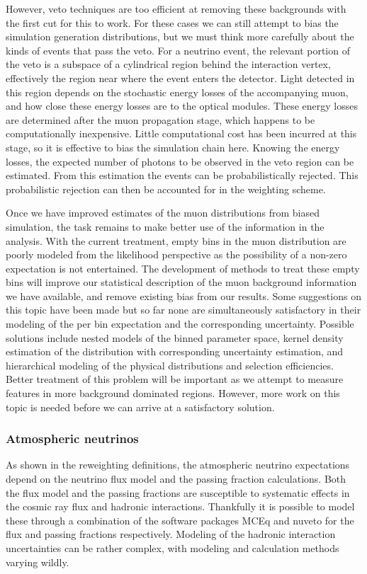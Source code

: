 However, veto techniques are too efficient at removing these backgrounds with the first cut for this to work.
For these cases we can still attempt to bias the simulation generation distributions, but we must think more carefully about the kinds of events that pass the veto.
For a neutrino event, the relevant portion of the veto is a subspace of a cylindrical region behind the interaction vertex, effectively the region near where the event enters the detector.
Light detected in this region depends on the stochastic energy losses of the accompanying muon, and how close these energy losses are to the optical modules.
These energy losses are determined after the muon propagation stage, which happens to be computationally inexpensive.
Little computational cost has been incurred at this stage, so it is effective to bias the simulation chain here.
Knowing the energy losses, the expected number of photons to be observed in the veto region can be estimated.
From this estimation the events can be probabilistically rejected.
This probabilistic rejection can then be accounted for in the weighting scheme.

Once we have improved estimates of the muon distributions from biased simulation, the task remains to make better use of the information in the analysis.
With the current treatment, empty bins in the muon distribution are poorly modeled from the likelihood perspective as the possibility of a non-zero expectation is not entertained.
The development of methods to treat these empty bins will improve our statistical description of the muon background information we have available, and remove existing bias from our results.
Some suggestions on this topic have been made but so far none are simultaneously satisfactory in their modeling of the per bin expectation and the corresponding uncertainty.
Possible solutions include nested models of the binned parameter space, kernel density estimation of the distribution with corresponding uncertainty estimation, and hierarchical modeling of the physical distributions and selection efficiencies.
Better treatment of this problem will be important as we attempt to measure features in more background dominated regions.
However, more work on this topic is needed before we can arrive at a satisfactory solution.

\subsubsection{Atmospheric neutrinos}
As shown in the reweighting definitions, the atmospheric neutrino expectations depend on the neutrino flux model and the passing fraction calculations.
Both the flux model and the passing fractions are susceptible to systematic effects in the cosmic ray flux and hadronic interactions.
Thankfully it is possible to model these through a combination of the software packages MCEq and nuveto for the flux and passing fractions respectively.
Modeling of the hadronic interaction uncertainties can be rather complex, with modeling and calculation methods varying wildly.

